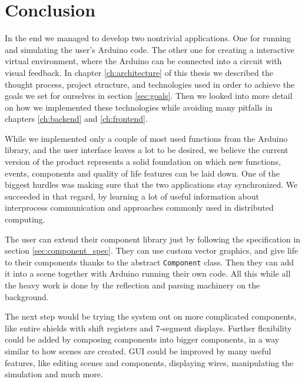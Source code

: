 \chapter*{Conclusion}

In the end we managed to develop two nontrivial applications. One for running and simulating the user's Arduino code. The other one for creating a interactive virtual environment, where the Arduino can be connected into a circuit with visual feedback. In chapter \ref{ch:architecture} of this thesis we described the thought process, project structure, and technologies used in order to achieve the goals we set for ourselves in section \ref{sec:goals}. Then we looked into more detail on how we implemented these technologies while avoiding many pitfalls in chapters \ref{ch:backend} and \ref{ch:frontend}.

While we implemented only a couple of most used functions from the Arduino library, and the user interface leaves a lot to be desired, we believe the current version of the product represents a solid foundation on which new functions, events, components and quality of life features can be laid down. One of the biggest hurdles was making sure that the two applications stay synchronized. We succeeded in that regard, by learning a lot of useful information about interprocess communication and approaches commonly used in distributed computing.

The user can extend their component library just by following the specification in section \ref{sec:component_spec}. They can use custom vector graphics, and give life to their components thanks to the abstract \texttt{Component} class. Then they can add it into a scene together with Arduino running their own code. All this while all the heavy work is done by the reflection and parsing machinery on the background. 

The next step would be trying the system out on more complicated components, like entire shields with shift registers and 7-segment displays. Further flexibility could be added by composing components into bigger components, in a way similar to how scenes are created. GUI could be improved by many useful features, like editing scenes and components, displaying wires, manipulating the simulation and much more.